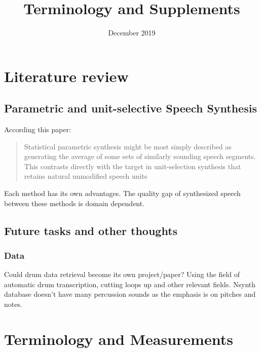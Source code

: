 \documentclass{article}
\title{Terminology and Supplements}
\date{December 2019}
\begin{document}
\maketitle
\section{Literature review}
\subsection{Parametric and unit-selective Speech Synthesis \cite{zen2009statistical}}
According this paper:
\blockquote[\cite{zen2009statistical}]{
Statistical parametric synthesis might be most simply described as generating the average of some sets of similarly sounding speech  segments.    This  contrasts  directly  with  the  target  in unit-selection synthesis that retains natural unmodified speech units}
Each method has its own advantages. The quality gap of synthesized speech between these methods is domain dependent.\cite{zen2009statistical}

\cite{esling2018generative}

\subsection{Future tasks and other thoughts}
\subsubsection{Data}
Could drum data retrieval become its own project/paper? Using the field of automatic drum transcription, cutting loops up and other relevant fields. Nsynth \cite{nsynth2017} database doesn't have many percussion sounds as the emphasis is on pitches and notes. 
\section{Terminology and Measurements}



\end{document}
